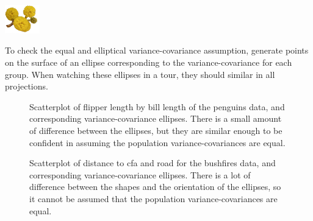 \documentclass[
  letterpaper,
]{krantz}
\newenvironment{Shaded}{\begin{snugshade}}{\end{snugshade}}
\newcommand{\AttributeTok}[1]{\textcolor[rgb]{0.40,0.45,0.13}{#1}}
\newcommand{\CommentTok}[1]{\textcolor[rgb]{0.37,0.37,0.37}{#1}}
\newcommand{\ConstantTok}[1]{\textcolor[rgb]{0.56,0.35,0.01}{#1}}
\newcommand{\ControlFlowTok}[1]{\textcolor[rgb]{0.00,0.23,0.31}{\textbf{#1}}}
\newcommand{\DecValTok}[1]{\textcolor[rgb]{0.68,0.00,0.00}{#1}}
\newcommand{\FloatTok}[1]{\textcolor[rgb]{0.68,0.00,0.00}{#1}}
\newcommand{\FunctionTok}[1]{\textcolor[rgb]{0.28,0.35,0.67}{#1}}
\newcommand{\NormalTok}[1]{\textcolor[rgb]{0.00,0.23,0.31}{#1}}
\newcommand{\OtherTok}[1]{\textcolor[rgb]{0.00,0.23,0.31}{#1}}
\newcommand{\SpecialCharTok}[1]{\textcolor[rgb]{0.37,0.37,0.37}{#1}}
\newcommand{\infobox}[1]{%
\noindent\colorbox{info!30}{%
\begin{minipage}{0.98\linewidth}%
    \centering%
    \begin{minipage}[c]{0.15\linewidth} %
      \includegraphics[width=1.5cm]{images/mulga-flowers2.png} %
    \end{minipage}%
    \hfill %
    \begin{minipage}[c]{0.8\linewidth} %
      \bigskip%
      \textsf{#1}%
      \bigskip%
    \end{minipage}%
    \hspace*{3mm}%
  \end{minipage}%
}%
}
\begin{document}
\infobox{To check the equal and elliptical variance-covariance assumption, generate points on the surface of an ellipse corresponding to the variance-covariance for each group. When watching these ellipses in a tour, they should similar in all projections.
}

 

\begin{Shaded}
\end{Shaded}

\begin{figure}


\caption{\label{fig-lda-assumptions1}Scatterplot of flipper length by
bill length of the penguins data, and corresponding variance-covariance
ellipses. There is a small amount of difference between the ellipses,
but they are similar enough to be confident in assuming the population
variance-covariances are equal.}

\end{figure}%

\begin{figure}


\caption{\label{fig-lda-assumptions2}Scatterplot of distance to cfa and
road for the bushfires data, and corresponding variance-covariance
ellipses. There is a lot of difference between the shapes and the
orientation of the ellipses, so it cannot be assumed that the population
variance-covariances are equal.}

\end{figure}%
\end{document}
